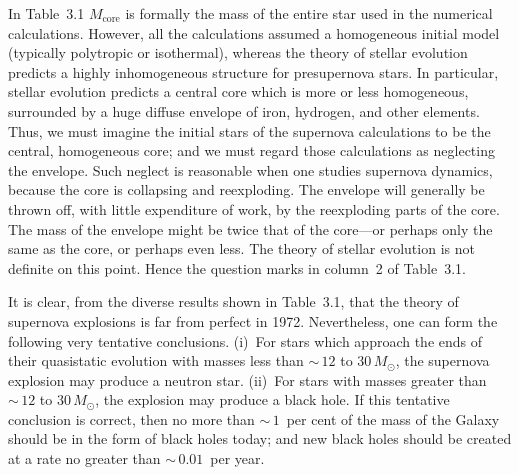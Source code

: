 
In Table~3.1 $M_{\text{core}}$ is formally the mass of the entire star used in the
numerical calculations.  However, all the calculations assumed a homogeneous
initial model (typically polytropic or isothermal), whereas the theory of stellar
evolution predicts a highly inhomogeneous structure for presupernova stars.  In
particular, stellar evolution predicts a central core which is more or less
homogeneous, surrounded by a huge diffuse envelope of iron, hydrogen, and other
elements.  Thus, we must imagine the initial stars of the supernova calculations to
be the central, homogeneous core; and we must regard those calculations as
neglecting the envelope.  Such neglect is reasonable when one studies supernova
dynamics, because the core is collapsing and reexploding.  The envelope will
generally be thrown off, with little expenditure of work, by the reexploding parts
of the core.  The mass of the envelope might be twice that of the core---or
perhaps only the same as the core, or perhaps even less.  The theory of stellar
evolution is not definite on this point.  Hence the question marks in column~2 of
Table~3.1.

It is clear, from the diverse results shown in Table~3.1, that the theory of
supernova explosions is far from perfect in 1972.  Nevertheless, one can form the
following very tentative conclusions.  (i)~For stars which approach the ends of
their quasistatic evolution with masses less than ${\sim}\,12$ to $30\,M_\odot$, the
supernova explosion may produce a neutron star.  (ii)~For stars with masses
greater than ${\sim}\,12$ to $30\,M_\odot$, the explosion may produce a black hole.  If
this tentative conclusion is correct, then no more than ${\sim}\,1$~per cent of the
mass of the Galaxy should be in the form of black holes today; and new black
holes should be created at a rate no greater than ${\sim}\,0.01$~per year.
